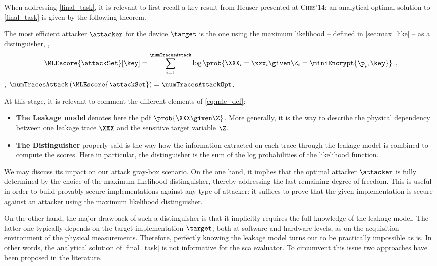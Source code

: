 When addressing \autoref{final_task}, it is relevant to first recall a key result from Heuser \etal{} presented at \textsc{Ches}'14: an analytical optimal solution to \autoref{final_task} is given by the following theorem.
\begin{theorem}
    \label{thm:opt_sol_prob1}
    The most efficient attacker \(\attacker\) for the device \(\target\) is the one using the maximum likelihood -- defined in \autoref{sec:max_like} -- as a distinguisher, \ie{},
    \begin{equation}
        \MLEscore{\attackSet}[\key] = \sum_{i=1}^{\numTracesAttack} \log \prob{\XXX_i = \xxx_i \given \Z_i = \miniEncrypt{\p_i, \key}} \enspace , 
        \label{eq:mle_def}
    \end{equation}
    \ie{}, \(\numTracesAttack \left( \MLEscore{\attackSet} \right) = \numTracesAttackOpt\).
\end{theorem}
At this stage, it is relevant to comment the different elements of \autoref{eq:mle_def}:
\begin{itemize}
    \item \textbf{The Leakage model} denotes here the \gls{pdf} \(\prob{\XXX \given \Z}\).
    More generally, it is the way to describe the physical dependency between one leakage trace \(\XXX\) and the sensitive target variable \(\Z\).
    \item \textbf{The Distinguisher} properly said is the way how the information extracted on each trace through the leakage model is combined to compute the scores.
    Here in particular, the distinguisher is the sum of the log probabilities of the likelihood function.
\end{itemize}

We may discuss its impact on our attack gray-box scenario.
On the one hand, it implies that the optimal attacker \(\attacker\) is fully determined by the choice of the maximum likelihood distinguisher, thereby addressing the last remaining degree of freedom.
This is useful in order to build provably secure implementations against any type of attacker: it suffices to prove that the given implementation is secure against an attacker using the maximum likelihood distinguisher.

On the other hand, the major drawback of such a distinguisher is that it implicitly requires the full knowledge of the leakage model.
The latter one typically depends on the target implementation \(\target\), both at software and hardware levels, as on the acquisition environment of the physical measurements.
Therefore, perfectly knowing the leakage model turns out to be practically impossible as is.
In other words, the analytical solution of \autoref{final_task} is not informative for the \gls{sca} evaluator.
To circumvent this issue two approaches have been proposed in the literature.

